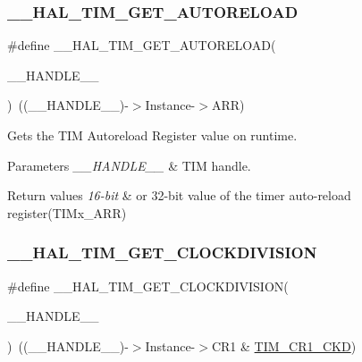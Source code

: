\subsubsection{\texorpdfstring{\+\_\+\+\_\+\+H\+A\+L\+\_\+\+T\+I\+M\+\_\+\+G\+E\+T\+\_\+\+A\+U\+T\+O\+R\+E\+L\+O\+AD}{\_\_HAL\_TIM\_GET\_AUTORELOAD}}
{\footnotesize\ttfamily \#define \+\_\+\+\_\+\+H\+A\+L\+\_\+\+T\+I\+M\+\_\+\+G\+E\+T\+\_\+\+A\+U\+T\+O\+R\+E\+L\+O\+AD(\begin{DoxyParamCaption}\item[{}]{\+\_\+\+\_\+\+H\+A\+N\+D\+L\+E\+\_\+\+\_\+ }\end{DoxyParamCaption})~((\+\_\+\+\_\+\+H\+A\+N\+D\+L\+E\+\_\+\+\_\+)-\/$>$Instance-\/$>$A\+RR)}



Gets the T\+IM Autoreload Register value on runtime. 


\begin{DoxyParams}{Parameters}
{\em \+\_\+\+\_\+\+H\+A\+N\+D\+L\+E\+\_\+\+\_\+} & T\+IM handle. \\
\hline
\end{DoxyParams}

\begin{DoxyRetVals}{Return values}
{\em 16-\/bit} & or 32-\/bit value of the timer auto-\/reload register(\+T\+I\+Mx\+\_\+\+A\+R\+R) \\
\hline
\end{DoxyRetVals}
\mbox{\label{group___t_i_m___exported___macros_gae6bc91bb5940bce52828c690f24001b8}} 
\subsubsection{\texorpdfstring{\+\_\+\+\_\+\+H\+A\+L\+\_\+\+T\+I\+M\+\_\+\+G\+E\+T\+\_\+\+C\+L\+O\+C\+K\+D\+I\+V\+I\+S\+I\+ON}{\_\_HAL\_TIM\_GET\_CLOCKDIVISION}}
{\footnotesize\ttfamily \#define \+\_\+\+\_\+\+H\+A\+L\+\_\+\+T\+I\+M\+\_\+\+G\+E\+T\+\_\+\+C\+L\+O\+C\+K\+D\+I\+V\+I\+S\+I\+ON(\begin{DoxyParamCaption}\item[{}]{\+\_\+\+\_\+\+H\+A\+N\+D\+L\+E\+\_\+\+\_\+ }\end{DoxyParamCaption})~((\+\_\+\+\_\+\+H\+A\+N\+D\+L\+E\+\_\+\+\_\+)-\/$>$Instance-\/$>$C\+R1 \& \mbox{\hyperlink{group___peripheral___registers___bits___definition_gacacc4ff7e5b75fd2e4e6b672ccd33a72}{T\+I\+M\+\_\+\+C\+R1\+\_\+\+C\+KD}})}



